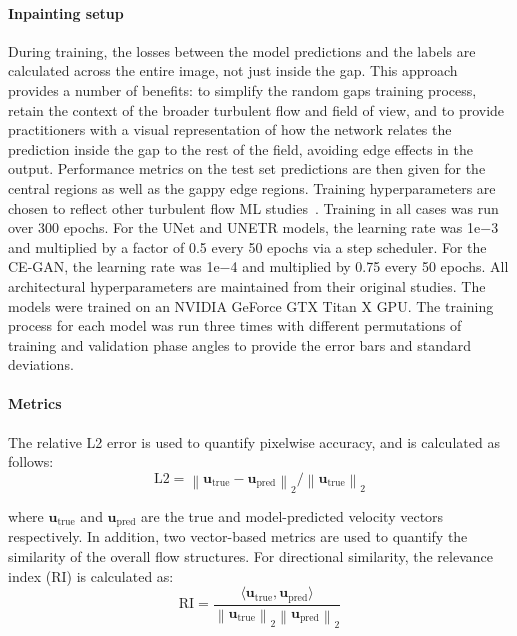 \documentclass{article}
\begin{document}
\paragraph{Inpainting setup} During training, the losses between the model predictions and the labels are calculated across the entire image, not just inside the gap. This approach provides a number of benefits: to simplify the random gaps training process, retain the context of the broader turbulent flow and field of view, and to provide practitioners with a visual representation of how the network relates the prediction inside the gap to the rest of the field, avoiding edge effects in the output. Performance metrics on the test set predictions are then given for the central regions as well as the gappy edge regions. Training hyperparameters are chosen to reflect other turbulent flow ML studies~\cite{chung2024turbulence,li2023multi}. Training in all cases was run over 300 epochs. For the UNet and UNETR models, the learning rate was 1e$-$3 and multiplied by a factor of 0.5 every 50 epochs via a step scheduler. For the CE-GAN, the learning rate was 1e$-$4 and multiplied by 0.75 every 50 epochs. All architectural hyperparameters are maintained from their original studies. The models were trained on an NVIDIA GeForce GTX Titan X GPU. The training process for each model was run three times with different permutations of training and validation phase angles to provide the error bars and standard deviations.  

\paragraph{Metrics} 
The relative L2 error is used to quantify pixelwise accuracy, and is calculated as follows:
\begin{equation}
\textrm{L2} =\left\|\boldsymbol{u}_{\mathrm{true}}-\boldsymbol{u}_{\mathrm{pred}}\right\|_2 /\left\|\boldsymbol{u}_{\mathrm{true}}\right\|_2
\end{equation}

where $\boldsymbol{u}_{\mathrm{true}}$ and $\boldsymbol{u}_{\mathrm{pred}}$ are the true and model-predicted velocity vectors respectively. In addition, two vector-based metrics are used to quantify the similarity of the overall flow structures. For directional similarity, the relevance index (RI) \cite{liu2011development} is calculated as:
\begin{equation}
    \textrm{RI}=\frac{\langle \boldsymbol{u}_{\mathrm{true}},\boldsymbol{u}_{\mathrm{pred}}\rangle}{\left\|\boldsymbol{u}_{\mathrm{true}}\right\|_2  \left\|\boldsymbol{u}_{\mathrm{pred}}\right\|_2}
    \label{eqn:RI}
\end{equation}
\end{document}
